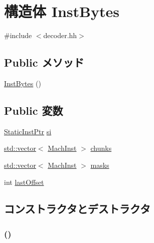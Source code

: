 \hypertarget{structX86ISA_1_1Decoder_1_1InstBytes}{
\section{構造体 InstBytes}
\label{structX86ISA_1_1Decoder_1_1InstBytes}
}


{\ttfamily \#include $<$decoder.hh$>$}\subsection*{Public メソッド}
\begin{DoxyCompactItemize}
\item 
\hyperlink{structX86ISA_1_1Decoder_1_1InstBytes_aaefc6e59b3e007f1f23178b084018400}{InstBytes} ()
\end{DoxyCompactItemize}
\subsection*{Public 変数}
\begin{DoxyCompactItemize}
\item 
\hyperlink{classRefCountingPtr}{StaticInstPtr} \hyperlink{structX86ISA_1_1Decoder_1_1InstBytes_ab06cd255e6bbc9122ae8010deb227fcb}{si}
\item 
\hyperlink{classstd_1_1vector}{std::vector}$<$ \hyperlink{namespaceX86ISA_a7ceadb544bf9b4a10579b7466b0ac008}{MachInst} $>$ \hyperlink{structX86ISA_1_1Decoder_1_1InstBytes_af7aeb5f9436fa23d13dae1008bace5bd}{chunks}
\item 
\hyperlink{classstd_1_1vector}{std::vector}$<$ \hyperlink{namespaceX86ISA_a7ceadb544bf9b4a10579b7466b0ac008}{MachInst} $>$ \hyperlink{structX86ISA_1_1Decoder_1_1InstBytes_ab2cdbb4c6963b40aa0924277bea8f8bf}{masks}
\item 
int \hyperlink{structX86ISA_1_1Decoder_1_1InstBytes_a50e2e39cbf969a7838e50a0dc8ddf88d}{lastOffset}
\end{DoxyCompactItemize}


\subsection{コンストラクタとデストラクタ}
\hypertarget{structX86ISA_1_1Decoder_1_1InstBytes_aaefc6e59b3e007f1f23178b084018400}{
\subsubsection[{InstBytes}]{ ()}}
\label{structX86ISA_1_1Decoder_1_1InstBytes_aaefc6e59b3e007f1f23178b084018400}



